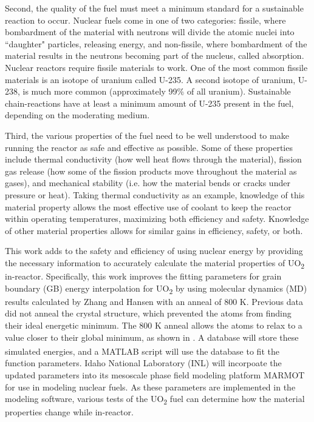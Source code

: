 \documentclass[twoside,senior]{BYUPhys}
\begin{document}
Second, the quality of the fuel must meet a minimum standard for a sustainable reaction to occur.  Nuclear fuels come in one of two categories: fissile, where bombardment of the material with neutrons will divide the atomic nuclei into ``daughter" particles, releasing energy, and non-fissile, where bombardment of the material results in the neutrons becoming part of the nucleus, called absorption.  Nuclear reactors require fissile materials to work.  One of the most common fissile materials is an isotope of uranium called U-235.  A second isotope of uranium, U-238, is much more common (approximately 99\% of all uranium).  Sustainable chain-reactions have at least a minimum amount of U-235 present in the fuel, depending on the moderating medium.\cite{uraniumInfo}

Third, the various properties of the fuel need to be well understood to make running the reactor as safe and effective as possible.  Some of these properties include thermal conductivity (how well heat flows through the material), fission gas release (how some of the fission products move throughout the material as gases), and mechanical stability (i.e. how the material bends or cracks under pressure or heat).  Taking thermal conductivity as an example, knowledge of this material property allows the most effective use of coolant to keep the reactor within operating temperatures, maximizing both efficiency and safety.  Knowledge of other material properties allows for similar gains in efficiency, safety, or both.


This work adds to the safety and efficiency of using nuclear energy by providing the necessary information to accurately calculate the material properties of UO\textsubscript{2} in-reactor.  Specifically, this work improves the fitting parameters for grain boundary (GB) energy interpolation for UO\textsubscript{2} by using molecular dynamics (MD) results calculated by Zhang\cite{zhang2016} and Hansen\cite{hansen2016} with an anneal of 800 K.  Previous data did not anneal the crystal structure\cite{harbison2015}, which prevented the atoms from finding their ideal energetic minimum.  The 800 K anneal allows the atoms to relax to a value closer to their global minimum, as shown in .  A database will store these simulated energies, and a MATLAB\textsuperscript{\textregistered} script will use the database to fit the function parameters.  Idaho National Laboratory (INL) will incorpoate the updated parameters into its mesoscale phase field modeling platform MARMOT for use in modeling nuclear fuels.  As these parameters are implemented in the modeling software, various tests of the UO\textsubscript{2} fuel can determine how the material properties change while in-reactor.
\end{document}
